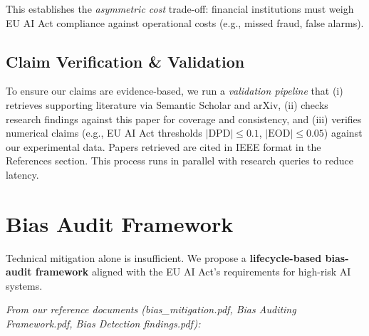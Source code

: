 \documentclass[conference]{IEEEtran}
\begin{document}
This establishes the \emph{asymmetric cost} trade-off: financial institutions must weigh EU AI Act compliance against operational costs (e.g., missed fraud, false alarms).

\subsection{Claim Verification \& Validation}

To ensure our claims are evidence-based, we run a \emph{validation pipeline} that (i) retrieves supporting literature via Semantic Scholar and arXiv, (ii) checks research findings against this paper for coverage and consistency, and (iii) verifies numerical claims (e.g., EU AI Act thresholds $|\mathrm{DPD}| \leq 0.1$, $|\mathrm{EOD}| \leq 0.05$) against our experimental data. Papers retrieved are cited in IEEE format in the References section. This process runs in parallel with research queries to reduce latency.

\section{Bias Audit Framework}
\label{sec:audit}

Technical mitigation alone is insufficient. We propose a \textbf{lifecycle-based bias-audit framework} aligned with the EU AI Act's requirements for high-risk AI systems.

\textit{From our reference documents (bias\_mitigation.pdf, Bias Auditing Framework.pdf, Bias Detection findings.pdf):}
\end{document}
